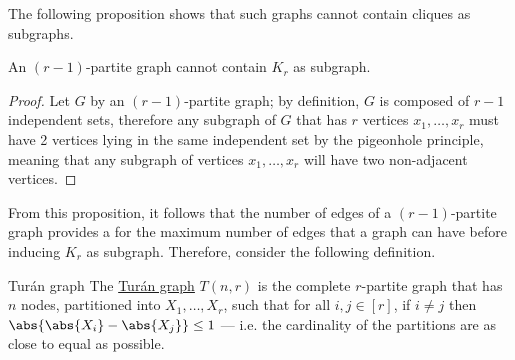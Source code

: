 \documentclass[a4paper, 12pt]{report}
\begin{document}
    The following proposition shows that such graphs cannot contain cliques as subgraphs.

    \begin{framedprop}[label={partite kr}]{}
        An $(r - 1)$-partite graph cannot contain $K_r$ as subgraph.
    \end{framedprop}
    
    \begin{proof}
        Let $G$ by an $(r-1)$-partite graph; by definition, $G$ is composed of $r - 1$ independent sets, therefore any subgraph of $G$ that has $r$ vertices $x_1, \ldots, x_r$ must have 2 vertices lying in the same independent set by the pigeonhole principle, meaning that any subgraph of vertices $x_1, \ldots, x_r$ will have two non-adjacent vertices.
    \end{proof}

    From this proposition, it follows that the number of edges of a  $(r - 1)$-partite graph provides a  for the maximum number of edges that a graph can have before inducing $K_r$ as subgraph. Therefore, consider the following definition.

    \begin{frameddefn}{Turán graph}
        The \href{https://en.wikipedia.org/wiki/Tur%C3%A1n_graph}{Turán graph} $T(n, r)$ is the complete $r$-partite graph that has $n$ nodes, partitioned into $X_1, \ldots, X_r$, such that for all $i, j \in [r]$, if $i \neq j$ then $\abs{\abs{X_i} - \abs{X_j}} \le 1$ --- i.e. the cardinality of the partitions are as close to equal as possible.
    \end{frameddefn}
\end{document}
